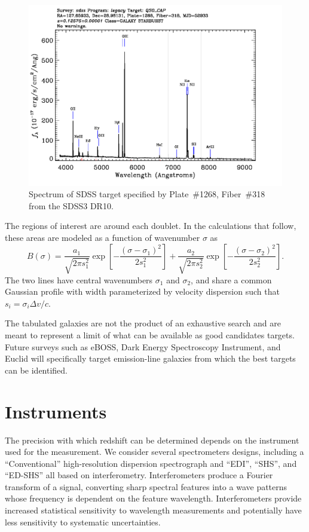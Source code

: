\documentclass[preprint]{aastex}
\begin{document}
\begin{figure}[t]
   \centering
    \includegraphics[scale=0.4]{SpecById.pdf} 
   \caption{Spectrum of SDSS target specified by Plate~\#1268, Fiber~\#318 from the SDSS3 DR10.  \label{shsinput:fig}}
\end{figure}

The regions of interest
are around each doublet.  In the calculations that follow, these areas are modeled as a function of wavenumber $\sigma$ as
\begin{equation}
B(\sigma)=\frac{a_1}{\sqrt{2\pi s_1^2}}\exp{\left[-\frac{\left(\sigma-\sigma_1\right)^2}{2s_1^2}\right]}+\frac{a_2}{\sqrt{2\pi s_2^2}}\exp{\left[-\frac{\left(\sigma-\sigma_2\right)^2}{2s_2^2}\right]}.
\label{input:eqn}
\end{equation}
The two lines have central wavenumbers $\sigma_1$ and $\sigma_2$, and share a common Gaussian profile with width parameterized by velocity dispersion
such that $s_i=\sigma_i\Delta v/c$. 

The tabulated galaxies are not the product of an exhaustive search and are meant to represent a limit of what can be available
as good
candidates targets.
Future surveys such as eBOSS, Dark Energy Spectroscopy Instrument, and Euclid will specifically target emission-line
galaxies from which the best targets can be identified.

\section{Instruments}
The precision with which redshift can be determined depends on the instrument used for the measurement.
We consider several spectrometers designs, including a ``Conventional'' high-resolution dispersion spectrograph and ``EDI'',
``SHS'', and ``ED-SHS'' all based on interferometry.  Interferometers produce a Fourier transform of a signal, converting sharp
spectral features into a wave patterns whose frequency is dependent on the feature wavelength.  Interferometers provide
increased statistical sensitivity to wavelength measurements and potentially have less sensitivity to systematic
uncertainties.
\end{document}
